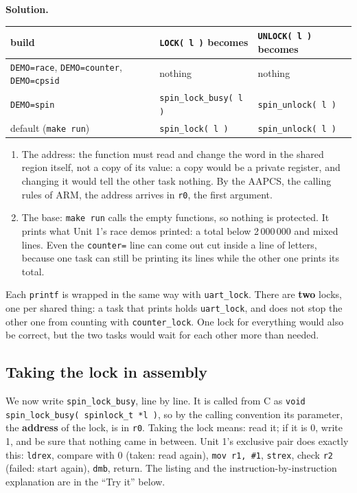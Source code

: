 \textbf{Solution.}
\begin{center}
\begin{tabular}{P{0.36} P{0.3} P{0.26}}
    \hline
    \textbf{build} & \texttt{LOCK( l )} \textbf{becomes} & \texttt{UNLOCK( l )} \textbf{becomes} \\
    \hline
    \texttt{DEMO=race}, \texttt{DEMO=counter}, \texttt{DEMO=cpsid} & nothing & nothing \\
    \texttt{DEMO=spin} & \texttt{spin\_lock\_busy( l )} & \texttt{spin\_unlock( l )} \\
    default (\texttt{make run}) & \texttt{spin\_lock( l )} & \texttt{spin\_unlock( l )} \\
    \hline
\end{tabular}
\end{center}
\begin{enumerate}
    \item The address: the function must read and change the word in the shared region itself, not a copy of its value: a copy would be a private register, and changing it would tell the other task nothing. By the AAPCS, the calling rules of ARM, the address arrives in \texttt{r0}, the first argument.
    \item The base: \texttt{make run} calls the empty functions, so nothing is protected. It prints what Unit 1's race demos printed: a total below 2\,000\,000 and mixed lines. Even the \texttt{counter=} line can come out cut inside a line of letters, because one task can still be printing its lines while the other one prints its total.
\end{enumerate}
Each \texttt{printf} is wrapped in the same way with \texttt{uart\_lock}. There are \textbf{two} locks, one per shared thing: a task that prints holds \texttt{uart\_lock}, and does not stop the other one from counting with \texttt{counter\_lock}. One lock for everything would also be correct, but the two tasks would wait for each other more than needed.

\subsection{Taking the lock in assembly}
We now write \texttt{spin\_lock\_busy}, line by line. It is called from C as \texttt{void spin\_lock\_busy( spinlock\_t *l )}, so by the calling convention its parameter, the \textbf{address} of the lock, is in \texttt{r0}. Taking the lock means: read it; if it is 0, write 1, and be sure that nothing came in between. Unit 1's exclusive pair does exactly this: \texttt{ldrex}, compare with 0 (taken: read again), \texttt{mov r1, \#1}, \texttt{strex}, check \texttt{r2} (failed: start again), \texttt{dmb}, return. The listing and the instruction-by-instruction explanation are in the ``Try it'' below.

